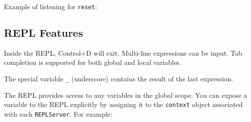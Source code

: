 Example of listening for \texttt{reset}:

\begin{Shaded}
\begin{Highlighting}[]
\NormalTok{(}\NormalTok{);}

\NormalTok{(}\NormalTok{, } 
  \NormalTok{(}\NormalTok{);}
\NormalTok{\});}
\end{Highlighting}
\end{Shaded}

\subsection{REPL Features}

Inside the REPL, Control+D will exit. Multi-line expressions can be
input. Tab completion is supported for both global and local variables.

The special variable \texttt{\_} (underscore) contains the result of the
last expression.

\begin{Shaded}
\begin{Highlighting}[]
\NormalTok{> [ }\NormalTok{, }\NormalTok{, } \NormalTok{]}
\NormalTok{[ }\NormalTok{, }\NormalTok{, } \NormalTok{]}
\NormalTok{> }\KeywordTok{_}
\NormalTok{> _ += }
\end{Highlighting}
\end{Shaded}

The REPL provides access to any variables in the global scope. You can
expose a variable to the REPL explicitly by assigning it to the
\texttt{context} object associated with each \texttt{REPLServer}. For
example:

\begin{Shaded}
\begin{Highlighting}[]
 \NormalTok{),}
    \NormalTok{;}

\NormalTok{(} 
\end{Highlighting}
\end{Shaded}

